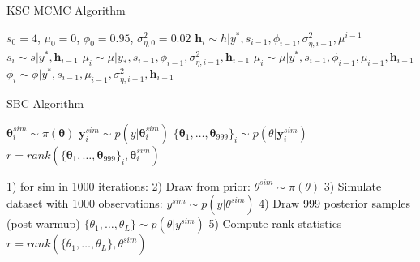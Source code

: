 \documentclass{article}
\begin{document}
        \begin{algorithm}[H]
            \caption{KSC MCMC Algorithm}\label{alg:ksc}
            \begin{algorithmic}
            \Require $s_0 = 4$, $\mu_0 = 0$, $\phi_0 = 0.95$, $\sigma^{2}_{\eta,0} = 0.02$
                    \State {} $\boldsymbol{h}_i \sim h|y^{\ast}, s_{i-1}, \phi_{i-1}, \sigma^{2}_{\eta,i-1}, \mu^{i-1}$ 
                    \State {} $s_i \sim s|y^{\ast}, \boldsymbol{h}_{i-1}$
                    \State {} $\mu_i \sim \mu|y_{\ast}, s_{i-1}, \phi_{i-1}, \sigma^{2}_{\eta, i-1}, \boldsymbol{h}_{i-1}$
                    \State {} $\mu_i \sim \mu|y^{\ast}, s_{i-1}, \phi_{i-1}, \mu_{i-1}, \boldsymbol{h}_{i-1}$
                    \State {} $\phi_i \sim \phi|y^{\ast}, s_{i-1}, \mu_{i-1}, \sigma^{2}_{\eta, i-1}, \boldsymbol{h}_{i-1}$
                  \EndFor
            \end{algorithmic}
            \end{algorithm}

\begin{algorithm}
\caption{SBC Algorithm}\label{alg:sbc}
\begin{algorithmic}
        \State {} $\boldsymbol{\theta}^{sim}_i \sim\pi (\boldsymbol{\theta})$
        \State {} $\boldsymbol{y}^{sim}_i \sim p(y|\boldsymbol{\theta}^{sim}_i)$
        \State {} $\{\boldsymbol{\theta}_1,\dots , \boldsymbol{\theta}_{999}\}_i \sim p(\theta | \boldsymbol{y}^{sim}_i)$
        \State {} $r = rank(\{\boldsymbol{\theta}_1,\dots , \boldsymbol{\theta}_{999}\}_i, \boldsymbol{\theta}^{sim}_i)$
      \EndFor
\end{algorithmic}
\end{algorithm}

    1) for sim in 1000 iterations:
        2) Draw from prior: $\theta^{sim}\sim\pi (\theta)$
        3) Simulate dataset with 1000 observations: $y^{sim} \sim p(y|\theta^{sim})$
        4) Draw 999 posterior samples (post warmup) $\{\theta_1,\dots , \theta_{L}\} \sim p(\theta | y^{sim})$
        5) Compute rank statistics $r = rank(\{\theta_1,\dots , \theta_{L}\}, \theta^{sim})$

\end{document}
